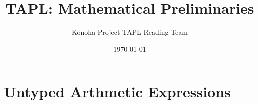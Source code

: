 \documentclass[12pt]{jsbook}
\title{TAPL: Mathematical Preliminaries}
\author{Konoha Project TAPL Reading Team}
\date{\today}
\begin{document}
\setcounter{chapter}{3}
\chapter{Untyped Arthmetic Expressions}






\end{document}
